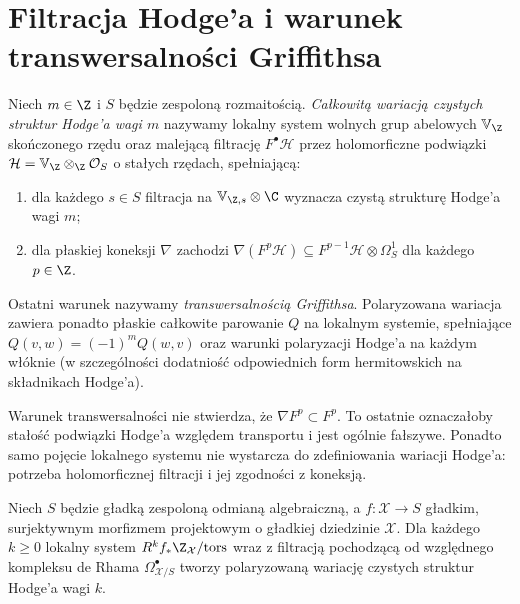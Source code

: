 \section{Filtracja Hodge'a i warunek transwersalności Griffithsa}
\begin{definicja}
Niech $m\in\Z$ i $S$ będzie zespoloną rozmaitością.
\emph{Całkowitą wariacją czystych struktur Hodge'a wagi $m$}
nazywamy lokalny system wolnych grup abelowych
$\mathbb V_{\Z}$ skończonego rzędu oraz malejącą
filtrację $F^\bullet\mathcal H$ przez holomorficzne
podwiązki $\mathcal H=\mathbb V_{\Z}\otimes_{\Z}\mathcal O_S$
o stałych rzędach, spełniającą:
\begin{enumerate}[label=\textup{(\roman*)},leftmargin=*]
\item dla każdego $s\in S$ filtracja na
$\mathbb V_{\Z,s}\otimes\C$ wyznacza czystą strukturę Hodge'a wagi $m$;
\item dla płaskiej koneksji $\nabla$ zachodzi
$\nabla(F^p\mathcal H)\subseteq
F^{p-1}\mathcal H\otimes\Omega_S^1$ dla każdego $p\in\Z$.
\end{enumerate}
Ostatni warunek nazywamy \emph{transwersalnością Griffithsa}.
Polaryzowana wariacja zawiera ponadto płaskie
całkowite parowanie $Q$ na lokalnym systemie,
spełniające $Q(v,w)=(-1)^mQ(w,v)$ oraz
warunki polaryzacji Hodge'a na każdym włóknie
(w szczególności dodatniość odpowiednich form
hermitowskich na składnikach Hodge'a).
\end{definicja}
\begin{uwaga}
Warunek transwersalności nie stwierdza, że
$\nabla F^p\subset F^p$. To ostatnie oznaczałoby
stałość podwiązki Hodge'a względem transportu i jest
ogólnie fałszywe. Ponadto samo pojęcie lokalnego systemu
nie wystarcza do zdefiniowania wariacji Hodge'a: potrzeba
holomorficznej filtracji i jej zgodności z koneksją.
\end{uwaga}
\begin{twierdzenie}
\label{thm:xv-vhs-family}
Niech $S$ będzie gładką zespoloną odmianą algebraiczną,
a $f:\mathcal X\to S$ gładkim, surjektywnym
morfizmem projektowym o gładkiej dziedzinie $\mathcal X$.
Dla każdego $k\ge0$ lokalny system
$R^kf_*\Z_{\mathcal X}/\mathrm{tors}$ wraz z filtracją
pochodzącą od względnego kompleksu de Rhama
$\Omega^\bullet_{\mathcal X/S}$ tworzy polaryzowaną
wariację czystych struktur Hodge'a wagi $k$.
\end{twierdzenie}
